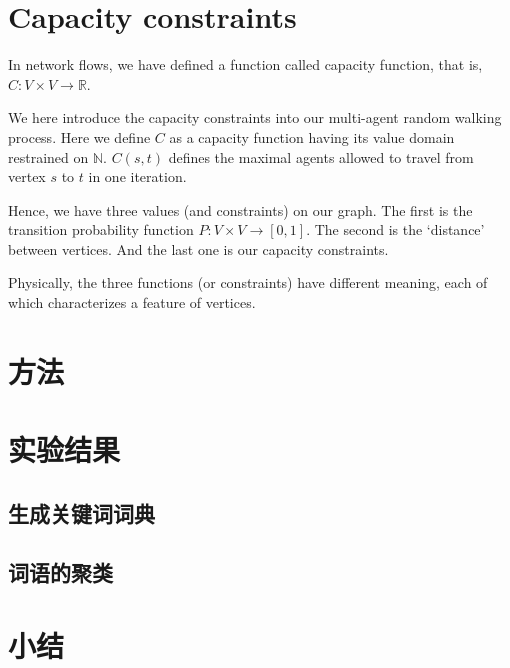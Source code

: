 \documentclass[12pt,a4paper]{article}
\begin{document}
\begin{CJK*}{UTF8}{song}
\section{Capacity constraints}
In network flows, we have defined a function called capacity function, that is, $C: V \times V \rightarrow \mathbb{R}$.

We here introduce the capacity constraints into our multi-agent random walking process. Here we define $C$ as a capacity function having its value domain restrained on $\mathbb{N}$. $C(s,t)$ defines the maximal agents allowed to travel from vertex $s$ to $t$ in one iteration. 

Hence, we have three values (and constraints) on our graph. The first is the transition probability function $P: V \times V \rightarrow [0, 1]$. The second is the `distance' between vertices. And the last one is our capacity constraints.

Physically, the three functions (or constraints) have different meaning, each of which characterizes a feature of vertices. 

\section{方法}


\section{实验结果}


\subsection{生成关键词词典}


\subsection{词语的聚类}


\section{小结}


\renewcommand\refname{References}



\end{CJK*}
\end{document}
